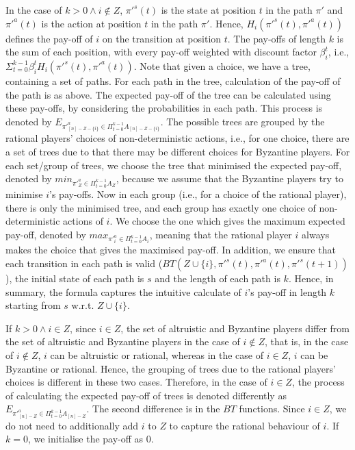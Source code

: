In the case of $k > 0 \wedge i \notin Z$, $\pi'^{s}(t)$ is the state at position $t$ in the path $\pi'$
and $\pi'^{a}(t)$ is the action at position $t$ in the path $\pi'$.
Hence, $H_{i}(\pi'^{s}(t),\pi'^{a}(t))$ defines the pay-off of $i$ on the transition at position $t$.
The pay-offs of length $k$ is the sum of each position, with every pay-off weighted with discount factor $\beta_i^t$, i.e., $\Sigma_{t=0}^{k-1} \beta_i^{t}H_{i}(\pi'^{s}(t),\pi'^{a}(t))$. Note that given a choice, we have a tree, containing a set of paths.
For each path in the tree, calculation of the pay-off of the path is as above. 
The expected pay-off of the tree can be calculated using these pay-offs, by considering the probabilities in each path.
This process is denoted by $E_{\pi'^{a}_{[n]-Z-\{i\}} \in \Pi_{t=0}^{k-1} A_{[n]-Z-\{i\}}}$.
The possible trees are grouped by the rational players' choices of non-deterministic actions, i.e., for one choice, there are a set of trees due to that there
may be different choices for Byzantine players. For each set/group of trees,
we choose the tree that minimised the expected pay-off, denoted by $min_{\pi'^{a}_{Z} \in \Pi_{t=0}^{k-1} A_{Z}}$,
because we assume that the Byzantine players try to minimise $i$'s pay-offs.
Now in each group (i.e., for a choice of the rational player), there is only the minimised tree,
and each group has exactly one choice of non-deterministic actions of $i$.
We choose the one which gives the maximum expected pay-off, denoted by $max_{\pi'^{a}_{i} \in \Pi_{t=0}^{k-1} A_{i}}$, meaning that the rational player $i$
always makes the choice that gives the maximised pay-off. 
In addition, we ensure that each transition in each path is valid ($BT(Z\cup\{i\},\pi'^{s}(t),\pi'^{a}(t),\pi'^{s}(t+1))$),
the initial state of each path is $s$ and the length of each path is $k$. Hence, 
in summary, the formula captures the intuitive calculate of $i$'s pay-off in length $k$ starting from $s$ w.r.t. $Z\cup\{i\}$.

If $k > 0 \wedge i \in Z$, since $i\in Z$, the set of altruistic and Byzantine players
differ from the set of altruistic and Byzantine players in the case of $i\notin Z$, that is,
in the case of $i\notin Z$, $i$ can be altruistic or rational, whereas in the case of $i\in Z$,
$i$ can be Byzantine or rational. Hence, the grouping of trees due to the rational players' choices
is different in these two cases. Therefore, in the case of $i\in Z$, the process of calculating the
expected pay-off of trees is denoted differently as $E_{\pi'^{a}_{[n]-Z} \in \Pi_{t=0}^{k-1} A_{[n]-Z}}$.
The second difference is in the $BT$ functions. Since $i\in Z$, we do not need to additionally add $i$ to $Z$ to
capture the rational behaviour of $i$. 
If $k=0$, we initialise the pay-off as $0$.

